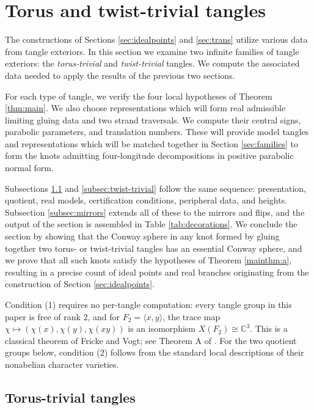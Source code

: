 \documentclass{article}
\theoremstyle{plain}
\theoremstyle{definition}
\theoremstyle{plain}
\theoremstyle{plain}
\theoremstyle{plain}
\theoremstyle{remark}
\theoremstyle{remark}
\theoremstyle{plain}
\theoremstyle{plain}
\newcounter{main}
\theoremstyle{plain}
\theoremstyle{plain}
\begin{document}
\section{Torus and twist-trivial tangles}\label{sec:twobridge}

The constructions of Sections \ref{sec:idealpoints} and \ref{sec:trans} utilize various data from tangle exteriors. In this section we examine two infinite families of tangle exteriors: the \emph{torus-trivial} and \emph{twist-trivial} tangles. We compute the associated data needed to apply the results of the previous two sections. 

\medskip

For each type of tangle, we verify the four local hypotheses of Theorem \ref{thm:main}. We also choose representations which will form real admissible limiting gluing data and two strand traversals. We compute their central signs, parabolic parameters, and translation numbers. These will provide model tangles and representations which will be matched together in Section \ref{sec:families} to form the knots admitting four-longitude decompositions in positive parabolic normal form. 

\medskip

Subsections \ref{subsec:torus-trivial} and \ref{subsec:twist-trivial} follow the same sequence: presentation, quotient, real models, certification conditions, peripheral data, and heights. Subsection \ref{subsec:mirrors} extends all of these to the mirrors and flips, and the output of the section is assembled in Table \ref{tab:decorations}. We conclude the section by showing that the Conway sphere in any knot formed by gluing together two torus- or twist-trivial tangles has an essential Conway sphere, and we prove that all such knots satisfy the hypotheses of Theorem \ref{mainthm:a}, resulting in a precise count of ideal points and real branches originating from the construction of Section \ref{sec:idealpoints}.

\medskip

Condition (1) requires no per-tangle computation: every tangle group in this paper is free of rank 2, and for $F_2 = \langle x, y \rangle$, the trace map $\chi \mapsto (\chi(x), \chi(y), \chi(xy))$ is an isomorphism $X(F_2) \cong \mathbb{C}^3$. This is a classical theorem of Fricke and Vogt; see Theorem A of \cite{goldman}. For the two quotient groups below, condition (2) follows from the standard local descriptions of their nonabelian character varieties.

\subsection{Torus-trivial tangles}\label{subsec:torus-trivial}
\end{document}
